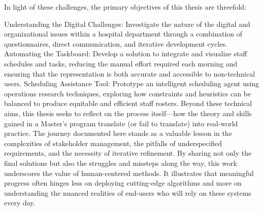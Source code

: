 In light of these challenges, the primary objectives of this thesis are threefold:

Understanding the Digital Challenges: Investigate the nature of the digital and organizational issues within a hospital department through a combination of questionnaires, direct communication, and iterative development cycles.
Automating the Taskboard: Develop a solution to integrate and visualize staff schedules and tasks, reducing the manual effort required each morning and ensuring that the representation is both accurate and accessible to non-technical users.
Scheduling Assistance Tool: Prototype an intelligent scheduling agent using operations research techniques, exploring how constraints and heuristics can be balanced to produce equitable and efficient staff rosters.
Beyond these technical aims, this thesis seeks to reflect on the process itself—how the theory and skills gained in a Master's program translate (or fail to translate) into real-world practice. The journey documented here stands as a valuable lesson in the complexities of stakeholder management, the pitfalls of underspecified requirements, and the necessity of iterative refinement. By sharing not only the final solutions but also the struggles and missteps along the way, this work underscores the value of human-centered methods. It illustrates that meaningful progress often hinges less on deploying cutting-edge algorithms and more on understanding the nuanced realities of end-users who will rely on these systems every day.
